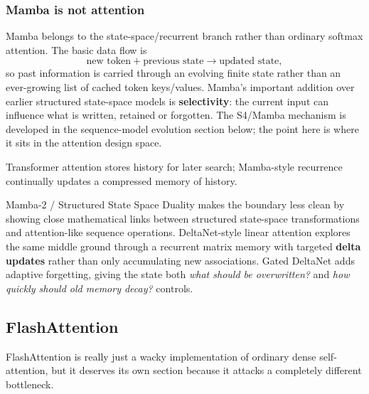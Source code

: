 \subsubsection{Mamba is not attention}
Mamba belongs to the state-space/recurrent branch rather than ordinary softmax attention.
The basic data flow is
\[
\text{new token}
+
\text{previous state}
\longrightarrow
\text{updated state},
\]
so past information is carried through an evolving finite state rather than an ever-growing list of cached token keys/values.
Mamba's important addition over earlier structured state-space models is \textbf{selectivity}: the current input can influence what is written, retained or forgotten.
The S4/Mamba mechanism is developed in the sequence-model evolution section below; the point here is where it sits in the attention design space.

\begin{calloutmemoryhook}
Transformer attention stores history for later search; Mamba-style recurrence continually updates a compressed memory of history.
\end{calloutmemoryhook}

Mamba-2 / Structured State Space Duality makes the boundary less clean by showing close mathematical links between structured state-space transformations and attention-like sequence operations.
DeltaNet-style linear attention explores the same middle ground through a recurrent matrix memory with targeted \textbf{delta updates} rather than only accumulating new associations.
Gated DeltaNet adds adaptive forgetting, giving the state both \textit{what should be overwritten?} and \textit{how quickly should old memory decay?} controls.

\subsection{FlashAttention}
\label{subsec:modern-flashattention}
FlashAttention is really just a wacky implementation of ordinary dense self-attention, but it deserves its own section because it attacks a completely different bottleneck.

